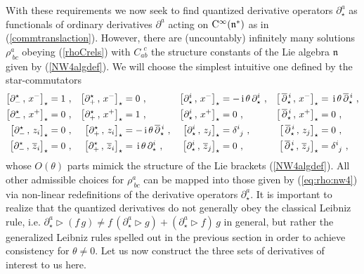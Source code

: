 \documentclass[11pt,a4paper]{article}
\def\ii{{\,{\rm i}\,}}
\def\CC{{\rm C}}
\def\mfn{{\mathfrak n}}
\begin{document}
With these requirements we now seek to find quantized derivative
operators $\partial_\star^a$ as functionals of ordinary derivatives
$\partial^a$ acting on $\CC^\infty(\mfn^*)$ as in
(\ref{commtranslaction}). However, there are (uncountably) infinitely
many solutions $\rho^a_{~bc}$ obeying (\ref{rhoCrels}) with
$C_{ab}^{~~c}$ the structure constants of the Lie algebra $\mfn$ given
by (\ref{NW4algdef}). We will choose the simplest intuitive one
defined by the star-commutators
\begin{align}
  \nonumber
  \left[\partial_-^\star\,,\,x^-\right]_\star&=1 \ ,
  &\left[\partial_+^\star\,,\,x^-\right]_\star&=0 \ ,
  &\left[\partial_\star^i\,,\,x^-\right]_\star&=-\ii\theta\,\partial_\star^i \ ,
  &\left[\,\overline{\partial}{}_\star^{\,i}\,,\,x^-\right]_\star&=
  \ii\theta\,\overline{\partial}{}_\star^{\,i} \ ,
  \\ \nonumber
  \left[\partial_-^\star\,,\,x^+\right]_\star&=0 \ ,
  &\left[\partial_+^\star\,,\,x^+\right]_\star &=1 \ ,
  &\left[\partial_\star^i\,,\,x^+\right]_\star&=0 \ ,
  &\left[\,\overline{\partial}{}_\star^{\,i}\,,\,x^+\right]_\star&=0 \ ,
  \\ \nonumber
  \left[\partial_-^\star\,,\,z_i\right]_\star&=0 \ ,
  &\left[\partial_+^\star\,,\,z_i\right]_\star&=-\ii\theta\,
  \overline{\partial}{}^{\,i}_\star \ ,
  &\left[\partial_\star^i\,,\,z_j\right]_\star&=\delta^i_{~j} \ ,
  &\left[\,\overline{\partial}{}_\star^{\,i}\,,\,z_j\right]_\star&=0 \ ,
  \\
  \left[\partial_-^\star\,,\,\overline{z}_i\right]_\star&=0  \ ,
  &\left[\partial_+^\star\,,\,\overline{z}_i\right]_\star&=
  \ii\theta\,\partial_\star^i \ ,
  &\left[\partial_\star^i\,,\,\overline{z}_j\right]_\star&=0 \ ,
  &\left[\,\overline{\partial}{}_\star^{\,i}\,,\,\overline{z}_j\right]_\star&
  =\delta^i_{~j} \ ,
\label{eq:rho:nw4}\end{align}
whose $O(\theta)$ parts mimick the structure of the Lie brackets
(\ref{NW4algdef}). All other admissible choices for $\rho^a_{~bc}$ can
be mapped into those given by (\ref{eq:rho:nw4}) via non-linear
redefinitions of the derivative operators $\partial^a_\star$. It is
important to realize that the quantized derivatives do not generally
obey the classical Leibniz rule,
i.e. $\partial_\star^a\triangleright(f\,g)\neq
f\,(\partial_\star^a\triangleright g)+(\partial_\star^a\triangleright
f)\,g$ in general, but rather the generalized Leibniz rules spelled
out in the previous section in order to achieve consistency for
$\theta\neq0$. Let us now construct the three sets of derivatives of
interest to us here.
\end{document}
